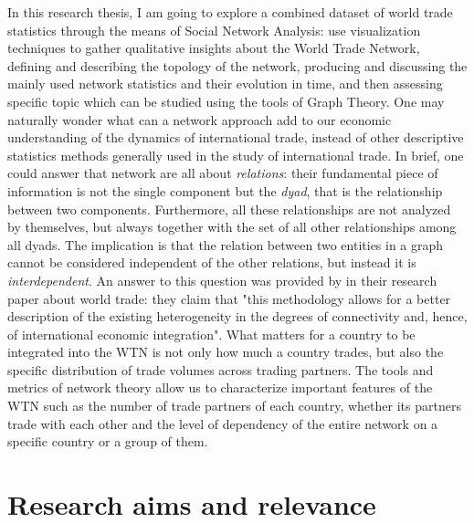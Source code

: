 In this research thesis, I am going to explore a combined dataset of world trade statistics through the means of Social Network Analysis: use visualization techniques to gather qualitative insights about the World Trade Network, defining and describing the topology of the network, producing and discussing the mainly used network statistics and their evolution in time, and then assessing specific topic which can be studied using the tools of Graph Theory.
One may naturally wonder what can a network approach add to our economic understanding of the dynamics of international trade, instead of other descriptive statistics methods generally used in the study of international trade. In brief, one could answer that network are all about \textit{relations}: their fundamental piece of information is not the single component but the \textit{dyad}, that is the relationship between two components. Furthermore, all these relationships are not analyzed by themselves, but always together with the set of all other relationships among all dyads. The implication is that the relation between two entities in a graph cannot be considered independent of the other relations, but instead it is \textit{interdependent}.
An answer to this question was provided by \textcite{fagiolo2010evolution} in their research paper about world trade: they claim that "this methodology allows for a better description of the existing heterogeneity in the degrees of connectivity and, hence, of international economic integration". What matters for a country to be integrated into the WTN is not only how much a country trades, but also the specific distribution of trade volumes across trading partners. The tools and metrics of network theory allow us to characterize important features of the WTN such as the number of trade partners of each country, whether its partners trade with each other and the level of dependency of the entire network on a specific country or a group of them. 


\section{Research aims and relevance}

